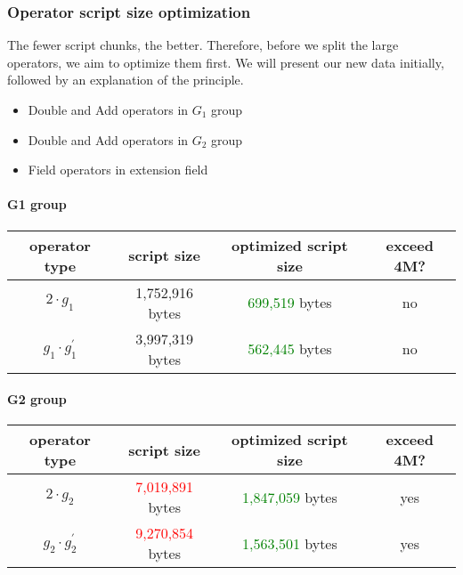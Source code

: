 \subsubsection{Operator script size optimization}

The fewer script chunks, the better. Therefore, before we split the large operators, we aim to optimize them first. We will present our new 
data initially, followed by an explanation of the principle.

\begin{itemize}
    \item Double and Add operators in $G_1$ group
    \item Double and Add operators in $G_2$ group
    \item Field operators in extension field
\end{itemize}

\paragraph*{G1 group}

\begin{center}
\begin{tabular}{|c|c|c|c|} \hline
operator type & script size & optimized script size & exceed 4M? \\ \hline
$2 \cdot g_1$ & 1,752,916 bytes & \textcolor{green}{699,519} bytes & no  \\ \hline
$g_1 \cdot g_1^{'}$ & 3,997,319 bytes &	\textcolor{green}{562,445} bytes & no \\ \hline
\end{tabular}
\end{center}

\paragraph*{G2 group}

\begin{center}
\begin{tabular}{|c|c|c|c|} \hline
operator type & script size & optimized script size & exceed 4M? \\ \hline
$2 \cdot g_2$ & \textcolor{red}{7,019,891} bytes & \textcolor{green}{1,847,059} bytes & yes  \\ \hline
$g_2 \cdot g_2^{'}$ & \textcolor{red}{9,270,854} bytes & \textcolor{green}{1,563,501} bytes & yes \\ \hline
\end{tabular}
\end{center}

